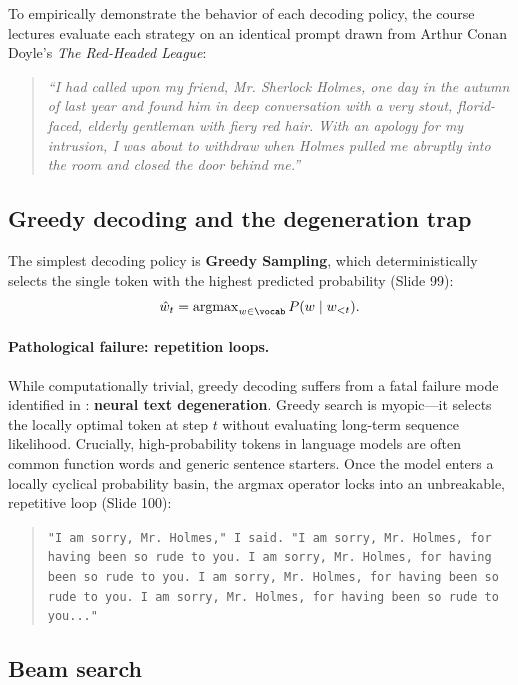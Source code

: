 \documentclass[../../main.tex]{subfiles}
\begin{document}
To empirically demonstrate the behavior of each decoding policy, the course lectures evaluate each strategy on an identical prompt drawn from Arthur Conan Doyle's \emph{The Red-Headed League}:
\begin{quote}
\emph{``I had called upon my friend, Mr. Sherlock Holmes, one day in the autumn of last year and found him in deep conversation with a very stout, florid-faced, elderly gentleman with fiery red hair. With an apology for my intrusion, I was about to withdraw when Holmes pulled me abruptly into the room and closed the door behind me.''}
\end{quote}

\subsection{Greedy decoding and the degeneration trap}
\label{subsec:greedy_decoding}

The simplest decoding policy is \textbf{Greedy Sampling}, which deterministically selects the single token with the highest predicted probability (Slide 99):
\begin{equation}
\label{eq:greedy_selection}
\hat{w}_t = \operatorname{argmax}_{w \in \vocab} P(w \mid w_{<t}).
\end{equation}

\paragraph{Pathological failure: repetition loops.}
While computationally trivial, greedy decoding suffers from a fatal failure mode identified in \cite{holtzman2020}: \textbf{neural text degeneration}. Greedy search is myopic—it selects the locally optimal token at step $t$ without evaluating long-term sequence likelihood.
Crucially, high-probability tokens in language models are often common function words and generic sentence starters. Once the model enters a locally cyclical probability basin, the argmax operator locks into an unbreakable, repetitive loop (Slide 100):
\begin{quote}
\texttt{"I am sorry, Mr. Holmes," I said. "I am sorry, Mr. Holmes, for having been so rude to you. I am sorry, Mr. Holmes, for having been so rude to you. I am sorry, Mr. Holmes, for having been so rude to you. I am sorry, Mr. Holmes, for having been so rude to you..."}
\end{quote}

\subsection{Beam search}
\label{subsec:beam_search}
\end{document}
